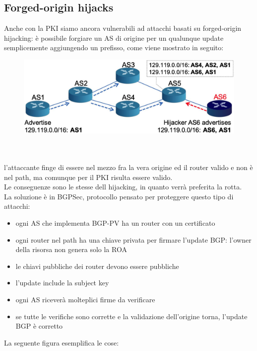 \documentclass[12pt, oneside]{extbook} %
\begin{document}
\subsection{Forged-origin hijacks}
Anche con la PKI siamo ancora vulnerabili ad attacchi basati su forged-origin hijacking: è possibile forgiare un AS di origine per un qualunque update semplicemente aggiungendo un prefisso, come viene mostrato in seguito:\\
\begin{figure}[h!]
    \centering
    \includegraphics[scale=0.5]{../../immagini/orig_hijack}
\end{figure}\\\\
l'attaccante finge di essere nel mezzo fra la vera origine ed il router valido e non è nel path, ma comunque per il PKI risulta essere valido.
\\Le conseguenze sono le stesse dell hijacking, in quanto verrà preferita la rotta.
\\La soluzione è in BGPSec, protocollo pensato per proteggere questo tipo di attacchi:
\begin{itemize}
	\item ogni AS che implementa BGP-PV ha un router con un certificato
	\item ogni router nel path ha una chiave privata per firmare l'update BGP: l'owner della risorsa non genera solo la ROA
	\item le chiavi pubbliche dei router devono essere pubbliche
	\item l'update include la subject key 
	\item ogni AS riceverà molteplici firme da verificare
    \item se tutte le verifiche sono corrette e la validazione dell'origine torna, l'update BGP è corretto
\end{itemize}
La seguente figura esemplifica le cose:\\
\end{document}
